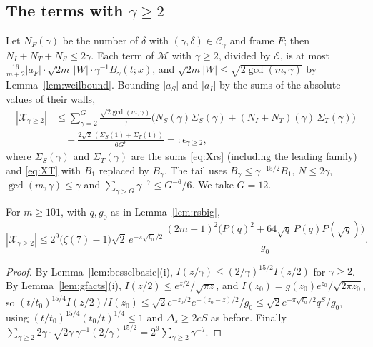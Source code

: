 \subsection{The terms with \texorpdfstring{$\gamma\ge2$}{gamma>=2}}
Let $N_F(\gamma)$ be the number of $\delta$ with $(\gamma,\delta)\in\mathcal C_\gamma$ and frame $F$; then $N_I+N_T+N_S\le2\gamma$. Each term of $\mathcal M$ with $\gamma\ge2$, divided by $\mathcal E$, is at most $\frac{16}{m+2}|a_F|\cdot\sqrt{2m}\,|W|\cdot\gamma^{-1}B_\gamma(t;x)$, and $\sqrt{2m}|W|\le\sqrt{2\gcd(m,\gamma)}$ by Lemma~\ref{lem:weilbound}. Bounding $|a_S|$ and $|a_I|$ by the sums of the absolute values of their walls,
\begin{equation}\label{eq:Xg2}
\begin{split}
|\mathcal X_{\gamma\ge2}|&\le\sum_{\gamma=2}^{G}\frac{\sqrt{2\gcd(m,\gamma)}}{\gamma}\big(N_S(\gamma)\Sigma_S(\gamma)+(N_I+N_T)(\gamma)\,\Sigma_T(\gamma)\big)\\
&\quad+\frac{2\sqrt2\,(\Sigma_S(1)+\Sigma_T(1))}{6G^6}=:\epsilon_{\gamma\ge2},
\end{split}
\end{equation}
where $\Sigma_S(\gamma)$ and $\Sigma_T(\gamma)$ are the sums \eqref{eq:Xrs} (including the leading family) and \eqref{eq:XT} with $B_1$ replaced by $B_\gamma$. The tail uses $B_\gamma\le\gamma^{-15/2}B_1$, $N\le2\gamma$, $\gcd(m,\gamma)\le\gamma$ and $\sum_{\gamma>G}\gamma^{-7}\le G^{-6}/6$. We take $G=12$.

\begin{lemma}\label{lem:g2big}
For $m\ge101$, with $q,g_0$ as in Lemma~\ref{lem:rsbig},
\[
|\mathcal X_{\gamma\ge2}|\le2^9\big(\zeta(7)-1\big)\sqrt2\,e^{-\pi\sqrt{t_0}/2}\,\frac{(2m+1)^2\big(P(q)^2+64\sqrt q\,P(q)P(\sqrt q)\big)}{g_0}.
\]
\end{lemma}

\begin{proof}
By Lemma~\ref{lem:besselbasic}(i), $I(z/\gamma)\le(2/\gamma)^{15/2}I(z/2)$ for $\gamma\ge2$. By Lemma~\ref{lem:gfacts}(i), $I(z/2)\le e^{z/2}/\sqrt{\pi z}$, and $I(z_0)=g(z_0)e^{z_0}/\sqrt{2\pi z_0}$, so $(t/t_0)^{15/4}I(z/2)/I(z_0)\le\sqrt2e^{-z_0/2}e^{-(z_0-z)/2}/g_0\le\sqrt2e^{-\pi\sqrt{t_0}/2}q^S/g_0$, using $(t/t_0)^{15/4}(t_0/t)^{1/4}\le1$ and $\Delta_s\ge2cS$ as before. Finally $\sum_{\gamma\ge2}2\gamma\cdot\sqrt{2\gamma}\,\gamma^{-1}(2/\gamma)^{15/2}=2^9\sum_{\gamma\ge2}\gamma^{-7}$.
\end{proof}

